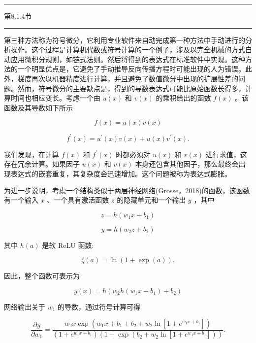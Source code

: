 \documentclass[10pt]{article}
\newcommand{\HRule}{\begin{center}\rule{0.9\linewidth}{0.2mm}\end{center}}
\begin{document}
\HRule

第8.1.4节

\HRule

第三种方法称为符号微分，它利用专业软件来自动完成第一种方法中手动进行的分析操作。这个过程是计算机代数或符号计算的一个例子，涉及以完全机械的方式自动应用微积分规则，如链式法则。然后将得到的表达式在标准软件中实现。这种方法的一个明显优点是，它避免了手动推导反向传播方程时可能出现的人为错误。此外，梯度再次以机器精度进行计算，并且避免了数值微分中出现的扩展性差的问题。然而，符号微分的主要缺点是，得到的导数表达式可能比原始函数长得多，计算时间也相应变长。考虑一个由 \(u\left( x\right)\) 和 \(v\left( x\right)\) 的乘积给出的函数 \(f\left( x\right)\) 。该函数及其导数如下所示

\[
f\left( x\right)  = u\left( x\right) v\left( x\right)  \tag{8.42}
\]

\[
{f}^{\prime }\left( x\right)  = {u}^{\prime }\left( x\right) v\left( x\right)  + u\left( x\right) {v}^{\prime }\left( x\right) . \tag{8.43}
\]

我们发现，在计算 \(f\left( x\right)\) 和 \({f}^{\prime }\left( x\right)\) 时都必须对 \(u\left( x\right)\) 和 \(v\left( x\right)\) 进行求值，这存在冗余计算。如果因子 \(u\left( x\right)\) 和 \(v\left( x\right)\) 本身还包含其他因子，那么最终会出现表达式的嵌套重复，其复杂度会迅速增加。这个问题被称为表达式膨胀。

为进一步说明，考虑一个结构类似于两层神经网络(Grosse，2018)的函数，该函数有一个输入 \(x\) 、一个具有激活函数 \(z\) 的隐藏单元和一个输出 \(y\) ，其中

\[
z = h\left( {{w}_{1}x + {b}_{1}}\right)  \tag{8.44}
\]

\[
y = h\left( {{w}_{2}z + {b}_{2}}\right)  \tag{8.45}
\]

其中 \(h\left( a\right)\) 是软 ReLU 函数:

\[
\zeta \left( a\right)  = \ln \left( {1 + \exp \left( a\right) }\right) . \tag{8.46}
\]

因此，整个函数可表示为

\[
y\left( x\right)  = h\left( {{w}_{2}h\left( {{w}_{1}x + {b}_{1}}\right)  + {b}_{2}}\right)  \tag{8.47}
\]

网络输出关于 \({w}_{1}\) 的导数，通过符号计算可得

\[
\frac{\partial y}{\partial {w}_{1}} = \frac{{w}_{2}x\exp \left( {{w}_{1}x + {b}_{1} + {b}_{2} + {w}_{2}\ln \left\lbrack  {1 + {e}^{{w}_{1}x + {b}_{1}}}\right\rbrack  }\right) }{\left( {1 + {e}^{{w}_{1}x + {b}_{1}}}\right) \left( {1 + \exp \left( {{b}_{2} + {w}_{2}\ln \left\lbrack  {1 + {e}^{{w}_{1}x + {b}_{1}}}\right\rbrack  }\right) }\right) }. \tag{8.48}
\]
\end{document}
